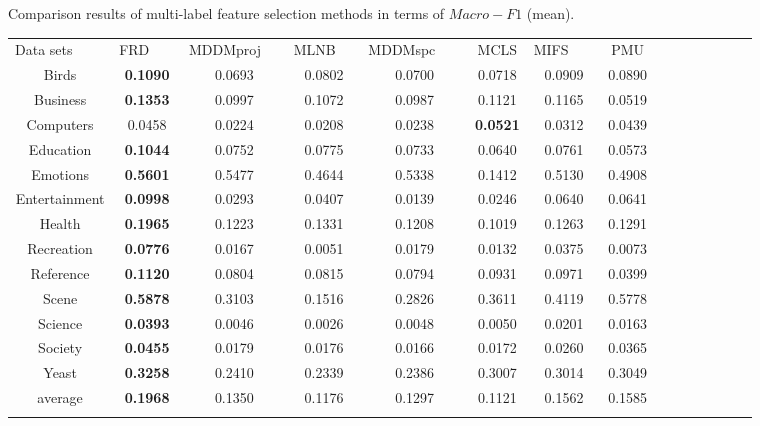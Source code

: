 \documentclass[final,3p,times]{elsarticle}
\begin{document}
\begin{table5-5*}
\begin{center}
\caption{Comparison results of multi-label feature selection methods in terms of $Macro-F1$ (mean).}
\label{tab:1}
\begin{tabular}{ccccccccccccccc}
\hline\noalign{\smallskip}
Data sets   ~~~~& FRD ~~~& MDDMproj ~~& MLNB  ~~& MDDMspc ~~~& MCLS & MIFS ~~~& PMU \\
\noalign{\smallskip}\hline\noalign{\smallskip}
Birds &	\textbf{0.1090}  &  0.0693   & 0.0802   & 0.0700  &  0.0718  &  0.0909   & 0.0890  \\

Business &	\textbf{0.1353}  &  0.0997  &  0.1072  &  0.0987  &  0.1121  &  0.1165  &  0.0519   \\

Computers &	0.0458 &   0.0224  &  0.0208  &  0.0238  &  \textbf{0.0521}  &  0.0312  &  0.0439   \\

Education &	\textbf{0.1044}   & 0.0752  &  0.0775  &  0.0733  &  0.0640  &  0.0761  &  0.0573   \\

Emotions &	\textbf{0.5601}   & 0.5477  &  0.4644  &  0.5338  &  0.1412  &  0.5130  &  0.4908   \\

Entertainment & \textbf{0.0998} &   0.0293  &  0.0407  &  0.0139 &   0.0246  &  0.0640  &  0.0641   \\

Health  &	\textbf{0.1965}  &  0.1223  &  0.1331  &  0.1208 &   0.1019  &  0.1263  &  0.1291  \\

Recreation &  \textbf{0.0776}  &  0.0167 &   0.0051  &  0.0179  &  0.0132   &   0.0375  &  0.0073  \\

Reference &	\textbf{0.1120}  &  0.0804  &  0.0815  &  0.0794  &  0.0931 &   0.0971  &  0.0399   \\

Scene &	\textbf{0.5878}  &  0.3103  &  0.1516   & 0.2826   & 0.3611  &  0.4119  &  0.5778   \\

Science &	\textbf{0.0393}  &  0.0046  &  0.0026  &  0.0048  &  0.0050  &  0.0201  &  0.0163   \\

Society &	\textbf{0.0455}  &  0.0179  &  0.0176  &  0.0166  &  0.0172  &  0.0260  &  0.0365    \\

Yeast &	\textbf{0.3258}  &  0.2410  &  0.2339  &  0.2386   & 0.3007   & 0.3014  &  0.3049    \\

average &  \textbf{0.1968}  &  0.1350  &  0.1176  &  0.1297   & 0.1121 &   0.1562  &  0.1585 \\
\noalign{\smallskip}\hline
\end{tabular}
\end{center}
\end{table5-5*}
\end{document}
